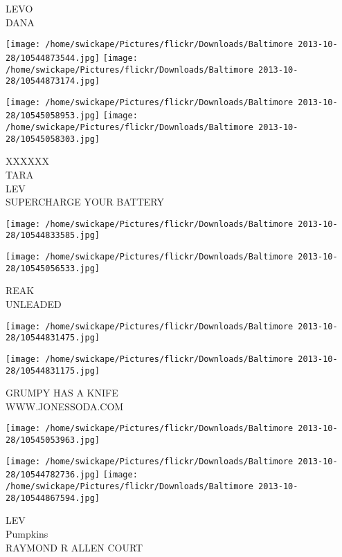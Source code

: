 \documentclass[10pt,letterpaper]{article}
\begin{document}
LEVO\\
DANA\\
\pagebreak

\texttt{[image: /home/swickape/Pictures/flickr/Downloads/Baltimore 2013-10-28/10544873544.jpg]}
\texttt{[image: /home/swickape/Pictures/flickr/Downloads/Baltimore 2013-10-28/10544873174.jpg]}

\texttt{[image: /home/swickape/Pictures/flickr/Downloads/Baltimore 2013-10-28/10545058953.jpg]}
\texttt{[image: /home/swickape/Pictures/flickr/Downloads/Baltimore 2013-10-28/10545058303.jpg]}

XXXXXX\\
TARA\\
LEV\\
SUPERCHARGE YOUR BATTERY\\
\pagebreak

\texttt{[image: /home/swickape/Pictures/flickr/Downloads/Baltimore 2013-10-28/10544833585.jpg]}

\vspace{0.25in}
\texttt{[image: /home/swickape/Pictures/flickr/Downloads/Baltimore 2013-10-28/10545056533.jpg]}

REAK\\
UNLEADED\\
\pagebreak

\texttt{[image: /home/swickape/Pictures/flickr/Downloads/Baltimore 2013-10-28/10544831475.jpg]}

\vspace{0.25in}
\texttt{[image: /home/swickape/Pictures/flickr/Downloads/Baltimore 2013-10-28/10544831175.jpg]}

GRUMPY HAS A KNIFE\\
WWW.JONESSODA.COM\\
\pagebreak

\texttt{[image: /home/swickape/Pictures/flickr/Downloads/Baltimore 2013-10-28/10545053963.jpg]}

\vspace{0.25in}
\texttt{[image: /home/swickape/Pictures/flickr/Downloads/Baltimore 2013-10-28/10544782736.jpg]}
\texttt{[image: /home/swickape/Pictures/flickr/Downloads/Baltimore 2013-10-28/10544867594.jpg]}

LEV\\
Pumpkins\\
RAYMOND R ALLEN COURT\\
\pagebreak
\end{document}
